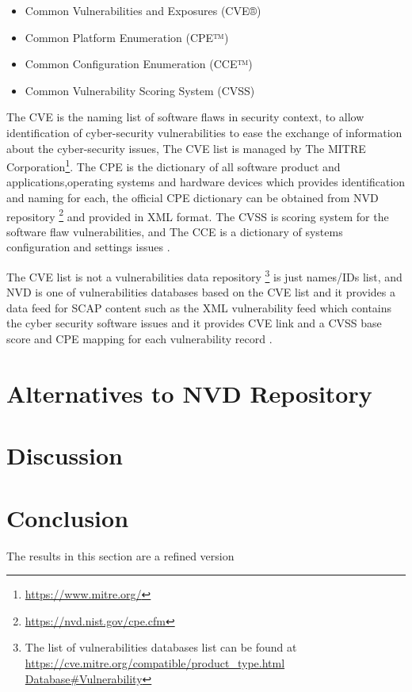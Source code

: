 \documentclass{llncs}
\begin{document}
 \begin{itemize}
 \item Common Vulnerabilities and Exposures (CVE®)
 \item Common Platform Enumeration (CPE™)
 \item  Common Configuration Enumeration (CCE™)
 \item Common Vulnerability Scoring System (CVSS)
 \end{itemize}
   
The CVE is the naming list of software flaws in security context, to allow identification of cyber-security vulnerabilities to ease the exchange of information about the cyber-security issues, The CVE list is managed by The MITRE Corporation\footnote{\url{https://www.mitre.org/}}. The CPE is the dictionary of all software product and applications,operating systems and hardware devices which provides identification and naming for each, the official CPE dictionary can be obtained from NVD repository \footnote{\url{https://nvd.nist.gov/cpe.cfm}} and provided in XML format. The CVSS is scoring system for the software flaw vulnerabilities, and The CCE is  a dictionary of systems configuration and settings issues \cite{scap_doc}.

The CVE list is not a vulnerabilities data repository \footnote{The list of vulnerabilities databases list can be found at  \url{https://cve.mitre.org/compatible/product_type.html Database\#Vulnerability}} is just names/IDs list, 
and NVD is one of vulnerabilities databases based on the CVE list and it provides a data feed for SCAP content such as  the XML vulnerability feed which contains the cyber security software issues and it provides CVE link and  a CVSS base score and CPE mapping for each vulnerability record \cite{nvd}.    
\newpage

\section{Alternatives to NVD Repository}


\newpage
\section{Discussion}

\newpage
\section{Conclusion}
The results in this section are a refined version
\end{document}
